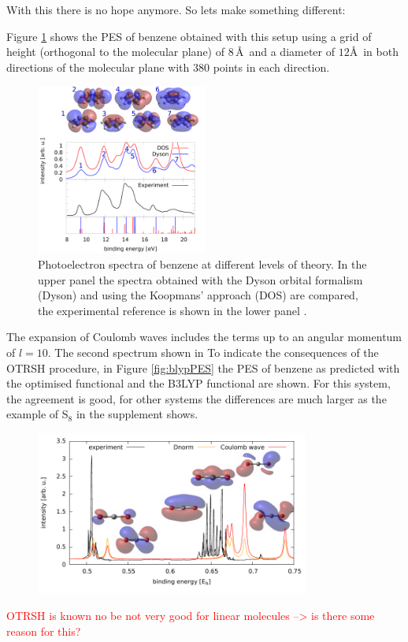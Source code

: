 With this there is no hope anymore. So lets make something different:

Figure \ref{fig:benzPES} shows the PES of benzene obtained with this setup using a grid of height (orthogonal to the molecular plane) of $8\,$\AA\, and a diameter of $12$\AA\, in both directions of the molecular plane with $380$ points in each direction.
\begin{figure}
   \includegraphics[width=0.5\textwidth]{Figures/Benzene/Benzene}
   \caption{Photoelectron spectra of benzene at different levels of theory.
   In the upper panel the spectra obtained with the Dyson orbital formalism (Dyson) and using the Koopmans' approach (DOS) are compared, the experimental reference is shown in the lower panel \cite{BenzExp}.}
   \label{fig:benzPES}
\end{figure}
The expansion of Coulomb waves includes the terms up to an angular momentum of $l=10$.
The second spectrum shown in 
To indicate the consequences of the OTRSH procedure, in Figure \ref{fig:blypPES} the PES of benzene as predicted with the optimised functional and the B3LYP functional are shown.
For this system, the agreement is good, for other systems the differences are much larger as the example of S$_8$ in the supplement shows.
\begin{figure}
   \includegraphics[width=0.8\textwidth]{Figures/CO2/CO2_spect}
   \caption{}
\end{figure}
\textcolor{red}{
OTRSH is known no be not very good for linear molecules --> is there some reason for this?
}
